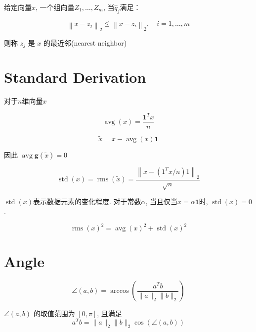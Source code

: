 \begin{definition}
    给定向量$x$, 一个组向量$ Z_{1}, \ldots, Z_{m} $, 当$ \hat{q}_{j} $满足：

    $$ \left\|x-z_{j}\right\|_{2} \leq\left\|x-z_{i}\right\|_{2}, \quad i=1, \ldots, m $$

    则称 $ z_{j} $ 是 $ x $ 的最近邻(nearest neighbor)
\end{definition}

\section{Standard Derivation}

\begin{definition}[算术平均值]
    对于$n$维向量$x$

    $$ \operatorname{avg}(x)=\frac{\mathbf{1}^{T} x}{n} $$
\end{definition}

\begin{definition}
    $$ \tilde{x}=x-\operatorname{avg}(x) \mathbf{1} $$

    因此 $ \operatorname{avg} \boldsymbol{g}(\tilde{x})=0 $
\end{definition}

\begin{definition}[$x$的标准差]
    $$ \operatorname{std}(x)=\operatorname{rms}(\tilde{x})=\frac{\left\|x-\left(1^{T} x / n\right) 1\right\|_{2}}{\sqrt{n}} $$
\end{definition}

$\operatorname{std}(x)$表示数据元素的变化程度. 对于常数$\alpha$, 当且仅当$ x=\alpha \mathbf{1} $时, $ \operatorname{std}(x)=0 $.

\begin{theorem}
    $$ \operatorname{rms}(x)^{2}=\operatorname{avg}(x)^{2}+\operatorname{std}(x)^{2} $$
\end{theorem}

\section{Angle}

\begin{definition}
    $$ \angle(a, b)=\arccos \left(\frac{a^{T} b}{\|a\|_{2}\|b\|_{2}}\right) $$

    $ \angle(a, b) $ 的取值范围为 $ [0, \pi] $, 且满足$$ a^{T} b=\|a\|_{2}\|b\|_{2} \cos (\angle(a, b)) $$
\end{definition}

